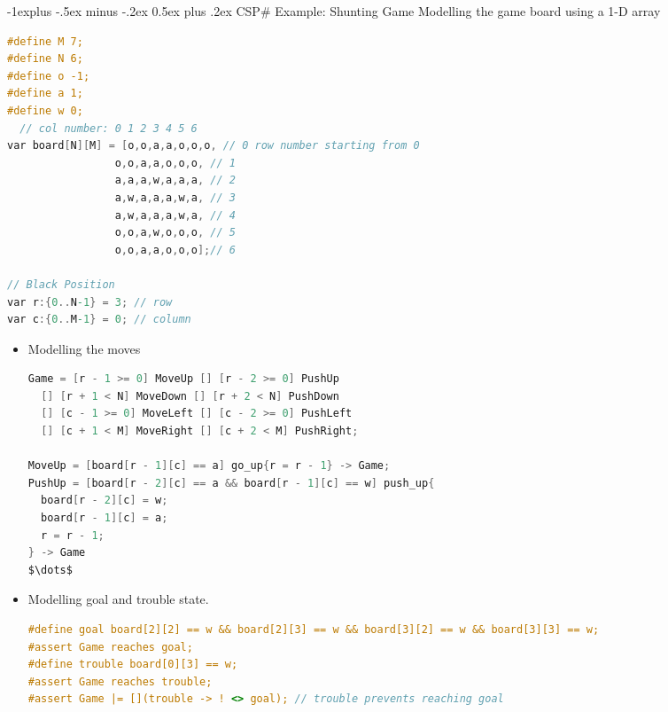 \documentclass[10pt, landscape]{article}
\makeatletter
\renewcommand{\subsection}{\@startsection{subsection}{2}{0mm}%
  {-1explus -.5ex minus -.2ex}%
  {0.5ex plus .2ex}%
{\normalfont\normalsize\bfseries}}
\makeatother
\begin{document}
\begin{multicols*}{2}
  \subsection{CSP\# Example: Shunting Game}
  Modelling the game board using a 1-D array
\begin{lstlisting}[language=C, basicstyle=\scriptsize\selectfont\ttfamily, mathescape]
#define M 7;
#define N 6;
#define o -1;
#define a 1;
#define w 0;
  // col number: 0 1 2 3 4 5 6
var board[N][M] = [o,o,a,a,o,o,o, // 0 row number starting from 0
                 o,o,a,a,o,o,o, // 1
                 a,a,a,w,a,a,a, // 2
                 a,w,a,a,a,w,a, // 3
                 a,w,a,a,a,w,a, // 4
                 o,o,a,w,o,o,o, // 5
                 o,o,a,a,o,o,o];// 6

// Black Position
var r:{0..N-1} = 3; // row
var c:{0..M-1} = 0; // column
\end{lstlisting}

  \begin{itemize}
    \item Modelling the moves
\begin{lstlisting}[language=C, basicstyle=\scriptsize\selectfont\ttfamily, mathescape]
Game = [r - 1 >= 0] MoveUp [] [r - 2 >= 0] PushUp
  [] [r + 1 < N] MoveDown [] [r + 2 < N] PushDown
  [] [c - 1 >= 0] MoveLeft [] [c - 2 >= 0] PushLeft
  [] [c + 1 < M] MoveRight [] [c + 2 < M] PushRight;

MoveUp = [board[r - 1][c] == a] go_up{r = r - 1} -> Game;
PushUp = [board[r - 2][c] == a && board[r - 1][c] == w] push_up{
  board[r - 2][c] = w;
  board[r - 1][c] = a;
  r = r - 1;
} -> Game
$\dots$
\end{lstlisting}
    \item Modelling goal and trouble state.
\begin{lstlisting}[language=C, basicstyle=\scriptsize\selectfont\ttfamily, mathescape]
#define goal board[2][2] == w && board[2][3] == w && board[3][2] == w && board[3][3] == w;
#assert Game reaches goal;
#define trouble board[0][3] == w;
#assert Game reaches trouble;
#assert Game |= [](trouble -> ! <> goal); // trouble prevents reaching goal
\end{lstlisting}
  \end{itemize}


\end{multicols*}
\end{document}
